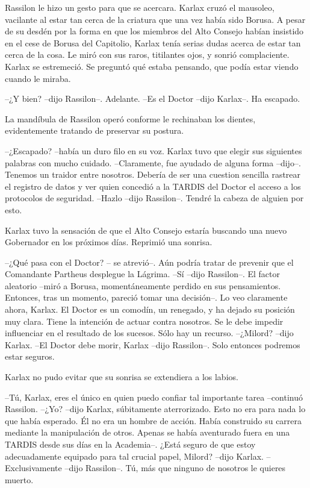Rassilon le hizo un gesto para que se acercara. Karlax cruzó el mausoleo, vacilante al estar tan cerca de la criatura que una vez había sido Borusa. A pesar de su desdén por la forma en que los miembros del Alto Consejo habían insistido en el cese de Borusa del Capitolio, Karlax tenía serias dudas acerca de estar tan cerca de la cosa. Le miró con sus raros, titilantes ojos, y sonrió complaciente. Karlax se estremeció. Se preguntó qué estaba pensando, que podía estar viendo cuando le miraba.

--¿Y bien? --dijo Rassilon--. Adelante.
--Es el Doctor --dijo Karlax--. Ha escapado.

La mandíbula de Rassilon operó conforme le rechinaban los dientes, evidentemente tratando de preservar su postura. 

--¿Escapado? --había un duro filo en su voz. Karlax tuvo que elegir sus siguientes palabras con mucho cuidado.
--Claramente, fue ayudado de alguna forma --dijo--. Tenemos un traidor entre nosotros. Debería de ser una cuestion sencilla rastrear el registro de datos y ver quien concedió a la TARDIS del Doctor el acceso a los protocolos de seguridad.
--Hazlo --dijo Rassilon--. Tendré la cabeza de alguien por esto.

Karlax tuvo la sensación de que el Alto Consejo estaría buscando una nuevo Gobernador en los próximos días. Reprimió una sonrisa. 

--¿Qué pasa con el Doctor? -- se atrevió--. Aún podría tratar de prevenir que el Comandante Partheus desplegue la Lágrima.
--Sí --dijo Rassilon--. El factor aleatorio --miró a Borusa, momentáneamente perdido en sus pensamientos. Entonces, tras un momento, pareció tomar una decisión--. Lo veo claramente ahora, Karlax. El Doctor es un comodín, un renegado, y ha dejado su posición muy clara. Tiene la intención de actuar contra nosotros. Se le debe impedir influenciar en el resultado de los sucesos. Sólo hay un recurso.
--¿Milord? --dijo Karlax.
--El Doctor debe morir, Karlax --dijo Rassilon--. Solo entonces podremos estar seguros.

Karlax no pudo evitar que su sonrisa se extendiera a los labios.

--Tú, Karlax, eres el único en quien puedo confiar tal importante tarea --continuó Rassilon.
--¿Yo? --dijo Karlax, súbitamente aterrorizado. Esto no era para nada lo que había esperado. Él no era un hombre de acción. Había construido su carrera mediante la manipulación de otros. Apenas se había aventurado fuera en una TARDIS desde sus días en la Academia--. ¿Está seguro de que estoy adecuadamente equipado para tal crucial papel, Milord? --dijo Karlax.
--Exclusivamente --dijo Rassilon--. Tú, más que ninguno de nosotros le quieres muerto.

